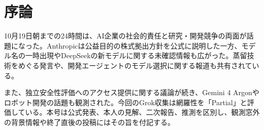 \section*{序論}
10月19日朝までの24時間は、AI企業の社会的責任と研究・開発競争の両面が話題になった。Anthropicは公益目的の株式拠出方針を公式に説明した一方、モデル名の一時出現やDeepSeekの新モデルに関する未確認情報も広がった。蒸留技術をめぐる発言や、開発エージェントのモデル選択に関する報道も共有されている。

また、独立安全性評価へのアクセス提供に関する議論が続き、Gemini 4 Argonやロボット開発の話題も観測された。今回のGrok収集は網羅性を「Partial」と評価している。本号は公式発表、本人の見解、二次報告、推測を区別し、観測窓外の背景情報や終了直後の投稿にはその旨を付記する。
